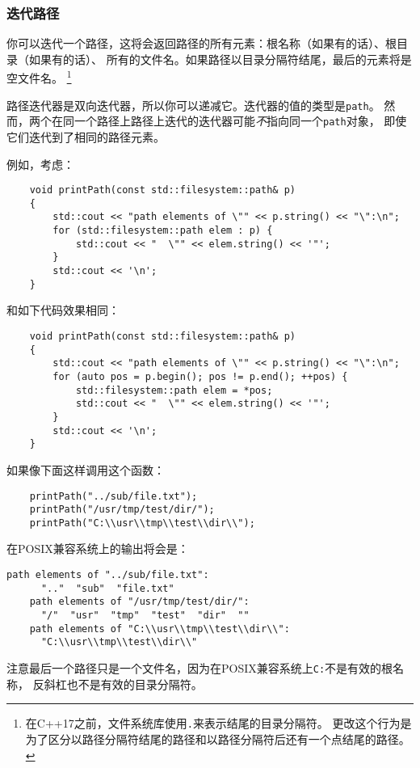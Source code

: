 \subsubsection{迭代路径}
你可以迭代一个路径，这将会返回路径的所有元素：根名称（如果有的话）、根目录（如果有的话）、
所有的文件名。如果路径以目录分隔符结尾，最后的元素将是空文件名。
\footnote{在C++17之前，文件系统库使用\texttt{.}来表示结尾的目录分隔符。
更改这个行为是为了区分以路径分隔符结尾的路径和以路径分隔符后还有一个点结尾的路径。}

路径迭代器是双向迭代器，所以你可以递减它。迭代器的值的类型是\texttt{path}。
然而，两个在同一个路径上路径上迭代的迭代器可能\emph{不}指向同一个\texttt{path}对象，
即使它们迭代到了相同的路径元素。

例如，考虑：
\begin{lstlisting}
    void printPath(const std::filesystem::path& p)
    {
        std::cout << "path elements of \"" << p.string() << "\":\n";
        for (std::filesystem::path elem : p) {
            std::cout << "  \"" << elem.string() << '"';
        }
        std::cout << '\n';
    }
\end{lstlisting}
和如下代码效果相同：
\begin{lstlisting}
    void printPath(const std::filesystem::path& p)
    {
        std::cout << "path elements of \"" << p.string() << "\":\n";
        for (auto pos = p.begin(); pos != p.end(); ++pos) {
            std::filesystem::path elem = *pos;
            std::cout << "  \"" << elem.string() << '"';
        }
        std::cout << '\n';
    }
\end{lstlisting}
如果像下面这样调用这个函数：
\begin{lstlisting}
    printPath("../sub/file.txt");
    printPath("/usr/tmp/test/dir/");
    printPath("C:\\usr\\tmp\\test\\dir\\");
\end{lstlisting}
在POSIX兼容系统上的输出将会是：
\begin{lstlisting}[stringstyle=\color{black}]
    path elements of "../sub/file.txt":
      ".."  "sub"  "file.txt"
    path elements of "/usr/tmp/test/dir/":
      "/"  "usr"  "tmp"  "test"  "dir"  ""
    path elements of "C:\\usr\\tmp\\test\\dir\\":
      "C:\\usr\\tmp\\test\\dir\\"
\end{lstlisting}
注意最后一个路径只是一个文件名，因为在POSIX兼容系统上\texttt{C:}不是有效的根名称，
反斜杠也不是有效的目录分隔符。

